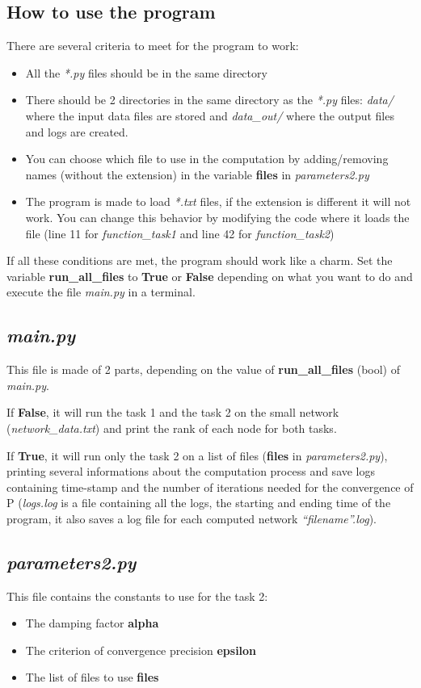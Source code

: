 \subsection{How to use the program}
There are several criteria to meet for the program to work:
\begin{itemize}
    \item All the \textit{*.py} files should be in the same directory
    \item There should be 2 directories in the same directory as the \textit{*.py} files: \textit{data/} where the input data files are stored and \textit{data\_out/} where the output files and logs are created.
    \item You can choose which file to use in the computation by adding/removing names (without the extension) in the variable \textbf{files} in \textit{parameters2.py}
    \item The program is made to load \textit{*.txt} files, if the extension is different it will not work. You can change this behavior by modifying the code where it loads the file (line 11 for \textit{function\_task1} and line 42 for \textit{function\_task2})
\end{itemize}
If all these conditions are met, the program should work like a charm. Set the variable \textbf{run\_all\_files} to \textbf{True} or \textbf{False} depending on what you want to do and execute the file \textit{main.py} in a terminal.

\subsection{\textit{main.py}}
This file is made of 2 parts, depending on the value of \textbf{run\_all\_files} (bool) of \textit{main.py}.

If \textbf{False}, it will run the task 1 and the task 2 on the small network (\textit{network\_data.txt}) and print the rank of each node for both tasks.

If \textbf{True}, it will run only the task 2 on a list of files (\textbf{files} in \textit{parameters2.py}), printing several informations about the computation process and save logs containing time-stamp and the number of iterations needed for the convergence of P (\textit{logs.log} is a file containing all the logs, the starting and ending time of the program, it also saves a log file for each computed network \textit{``filename''.log}).

\subsection{\textit{parameters2.py}}
This file contains the constants to use for the task 2:
\begin{itemize}
    \item The damping factor \textbf{alpha}
    \item The criterion of convergence precision \textbf{epsilon}
    \item The list of files to use \textbf{files}
\end{itemize}

